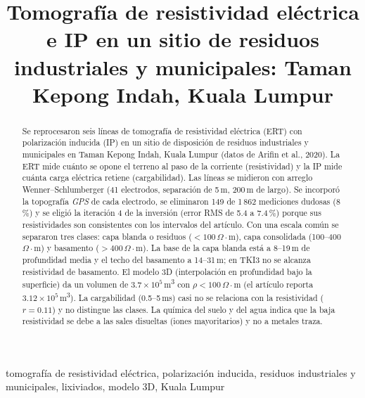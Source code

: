 \documentclass[conference]{IEEEtran}
\newcommand{\ohmm}{\ensuremath{\Omega\!\cdot\!\mathrm{m}}}
\newcommand{\mcub}{m\textsuperscript{3}}
\newcommand{\gps}{\textit{GPS}}
\begin{document}
\renewcommand{\IEEEkeywordsname}{Palabras clave}

\title{Tomografía de resistividad eléctrica e IP en un sitio de residuos industriales y municipales: Taman Kepong Indah, Kuala Lumpur}

\author{
}

\maketitle

\begin{abstract}
Se reprocesaron seis líneas de tomografía de resistividad eléctrica (ERT) con polarización inducida (IP) en un sitio de disposición de residuos industriales y municipales en Taman Kepong Indah, Kuala Lumpur (datos de Arifin et al., 2020). La ERT mide cuánto se opone el terreno al paso de la corriente (resistividad) y la IP mide cuánta carga eléctrica retiene (cargabilidad). Las líneas se midieron con arreglo Wenner--Schlumberger (41 electrodos, separación de 5\,m, 200\,m de largo). Se incorporó la topografía \gps{} de cada electrodo, se eliminaron 149 de 1\,862 mediciones dudosas (8\,\%) y se eligió la iteración 4 de la inversión (error RMS de 5.4 a 7.4\,\%) porque sus resistividades son consistentes con los intervalos del artículo. Con una escala común se separaron tres clases: capa blanda o residuos ($<100$\,\ohmm), capa consolidada (100--400\,\ohmm) y basamento ($>400$\,\ohmm). La base de la capa blanda está a 8--19\,m de profundidad media y el techo del basamento a 14--31\,m; en TKI3 no se alcanza resistividad de basamento. El modelo 3D (interpolación en profundidad bajo la superficie) da un volumen de $3.7\times10^{5}$\,\mcub{} con $\rho<100$\,\ohmm{} (el artículo reporta $3.12\times10^{5}$\,\mcub). La cargabilidad (0.5--5\,ms) casi no se relaciona con la resistividad ($r=0.11$) y no distingue las clases. La química del suelo y del agua indica que la baja resistividad se debe a las sales disueltas (iones mayoritarios) y no a metales traza.
\end{abstract}

\begin{IEEEkeywords}
tomografía de resistividad eléctrica, polarización inducida, residuos industriales y municipales, lixiviados, modelo 3D, Kuala Lumpur
\end{IEEEkeywords}
\end{document}
